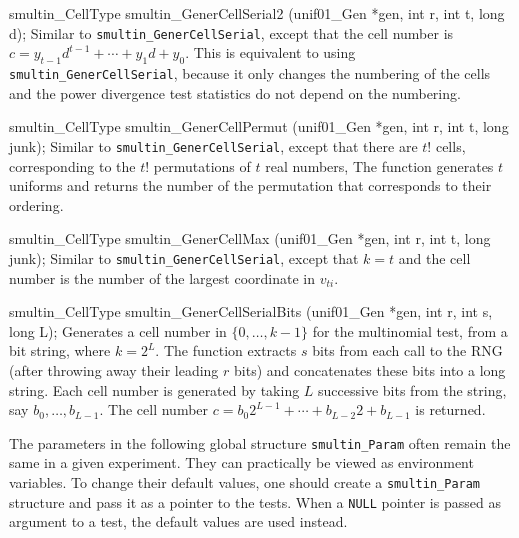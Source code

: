 smultin_CellType smultin_GenerCellSerial2 (unif01_Gen *gen, int r, int t,
                                           long d);
\endcode
 \tab  Similar to {\tt smultin\_GenerCellSerial}, except that the
   cell number is   $c = y_{t-1} d^{t-1} + \cdots + y_{1} d + y_0$.
   This is equivalent to using {\tt smultin\_GenerCellSerial}, 
   because it only changes the numbering of the cells and the power
   divergence test statistics do not depend on the numbering.
 \endtab
\code


smultin_CellType smultin_GenerCellPermut (unif01_Gen *gen, int r, int t,
                                          long junk);
\endcode
 \tab Similar to {\tt smultin\_GenerCellSerial}, except that there are
  $t!$ cells, corresponding to the $t!$ permutations of $t$ real numbers,
  The function generates $t$ uniforms and returns the number of the
  permutation that corresponds to their ordering.
 \endtab
\code


smultin_CellType smultin_GenerCellMax (unif01_Gen *gen, int r, int t,
                                       long junk);
\endcode
 \tab  Similar to {\tt smultin\_GenerCellSerial}, except that $k=t$
  and the cell number is the number of the largest coordinate in $v_{ti}$.
 \endtab
\hide
\code


smultin_CellType smultin_GenerCellSerialBits (unif01_Gen *gen, int r, int s,
                                              long L);
\endcode
 \tab  Generates a cell number in $\{0,\dots,k-1\}$ for the 
  multinomial test, from a bit string, where $k = 2^L$. 
  The function extracts $s$ bits from each call to the RNG 
  (after throwing away their leading $r$ bits)
  and concatenates these bits into a long string.
  Each cell number is generated by taking $L$ successive bits from 
  the string, say $b_0,\dots,b_{L-1}$.
  The cell number $c = b_0 2^{L-1} + \cdots + b_{L-2} 2 + b_{L-1}$
  is returned.
 \endtab
\endhide

\nopagebreak

The parameters in the following global structure {\tt smultin\_Param} 
often remain the same in a given experiment.
They can practically be viewed as environment variables.
To change their default values, one should create a {\tt smultin\_Param}
structure and pass it as a pointer to the tests. 
When a {\tt NULL} pointer is passed as argument to a test, the
default values are used instead.

\code


